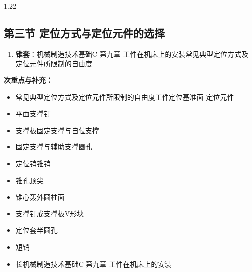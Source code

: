 \documentclass[12pt,a4paper]{article}
\begin{document}
\begin{spacing}{1.22}
\subsection{第三节 定位方式与定位元件的选择}
\begin{tcolorbox}[colback=yellow!6,colframe=red!55!black,title=重点,left=1mm,right=1mm]
\begin{enumerate}[leftmargin=2.2em,label=\arabic*.]
  \item \textbf{锥套}：机械制造技术基础C 第九章 工件在机床上的安装常见典型定位方式及定位元件所限制的自由度
\end{enumerate}
\end{tcolorbox}
\noindent\textbf{次重点与补充：}
\begin{itemize}[leftmargin=2.2em,label=--]
  \item 常见典型定位方式及定位元件所限制的自由度工件定位基准面 定位元件
  \item 平面支撑钉
  \item 支撑板固定支撑与自位支撑
  \item 固定支撑与辅助支撑圆孔
  \item 定位销锥销
  \item 锥孔顶尖
  \item 锥心轰外圆柱面
  \item 支撑钉戒支撑板V形块
  \item 定位套半圆孔
  \item 短销
  \item 长机械制造技术基础C 第九章 工件在机床上的安装
\end{itemize}


\end{spacing}
\end{document}
